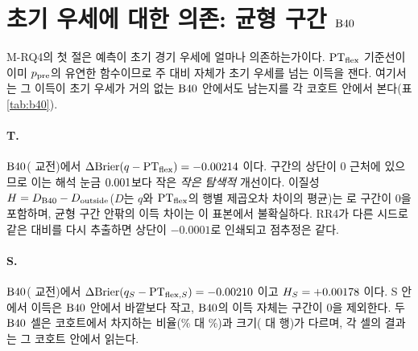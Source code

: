 \section{초기 우세에 대한 의존: 균형 구간 $\mathrm{B40}$}
\label{sec:val-b40}

M-RQ4의 첫 절은 예측이 초기 경기 우세에 얼마나 의존하는가이다. $\mathrm{PT}_{\mathrm{flex}}$ 기준선이 이미 $p_{\mathrm{pre}}$의 유연한 함수이므로 주 대비 자체가 초기 우세를 넘는 이득을 잰다. 여기서는 그 이득이 초기 우세가 거의 없는 $\mathrm{B40}$ 안에서도 남는지를 각 코호트 안에서 본다(표 \ref{tab:b40}).



\paragraph{T.} $\mathrm{B40}$(\numTBforty{} 교전)에서 $\Delta\mathrm{Brier}(q - \mathrm{PT}_{\mathrm{flex}}) = -0.00214$ \ci{\dBrierTBfortyLo}{\dBrierTBfortyHi}이다. 구간의 상단이 0 근처에 있으므로 이는 해석 눈금 $0.001$보다 작은 \emph{작은 탐색적} 개선이다. 이질성 $H = D_{\mathrm{B40}} - D_{\text{outside}}$($D$는 $q$와 $\mathrm{PT}_{\mathrm{flex}}$의 행별 제곱오차 차이의 평균)는 \hetT{} \ci{\hetTLo}{\hetTHi}로 구간이 0을 포함하며, 균형 구간 안팎의 이득 차이는 이 표본에서 불확실하다. RR4가 다른 시드로 같은 대비를 다시 추출하면 상단이 $-0.0001$로 인쇄되고 점추정은 같다.

\paragraph{S.} $\mathrm{B40}$(\numSBforty{} 교전)에서 $\Delta\mathrm{Brier}(q_{S} - \mathrm{PT}_{\mathrm{flex},S}) = -0.00210$ \ci{\dBrierSBfortyLo}{\dBrierSBfortyHi}이고 $H_S = +0.00178$ \ci{\hetSLo}{\hetSHi}이다. S 안에서 이득은 $\mathrm{B40}$ 안에서 바깥보다 작고, $\mathrm{B40}$의 이득 자체는 구간이 0을 제외한다. 두 $\mathrm{B40}$ 셀은 코호트에서 차지하는 비율(\shareTBforty\% 대 \shareSBforty\%)과 크기(\numTBforty{} 대 \numSBforty{} 행)가 다르며, 각 셀의 결과는 그 코호트 안에서 읽는다.

